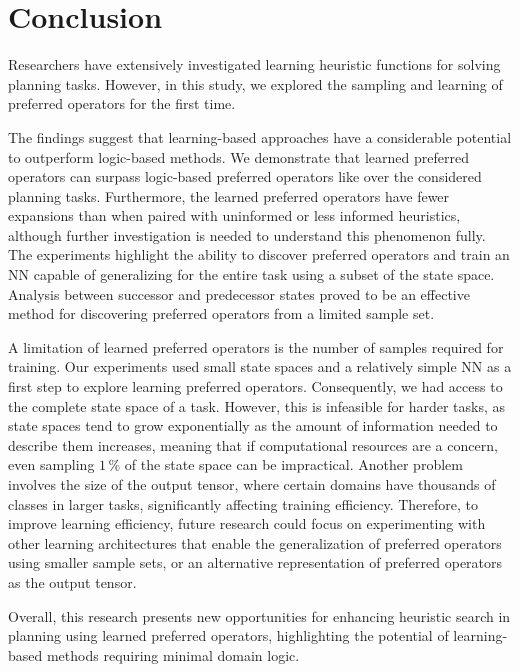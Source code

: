 \documentclass[ppgc,diss,english]{iiufrgs}
\begin{document}
\chapter{Conclusion}
\label{cha:conclusion}
Researchers have extensively investigated learning heuristic functions for solving planning tasks.
However, in this study, we explored the sampling and learning of preferred operators for the first time.

The findings suggest that learning-based approaches have a considerable potential to outperform logic-based methods. We demonstrate that learned preferred operators can surpass logic-based preferred operators like \poff over the considered planning tasks. Furthermore, the learned preferred operators have fewer expansions than \poff when paired with uninformed or less informed heuristics, although further investigation is needed to understand this phenomenon fully.
The experiments highlight the ability to discover preferred operators and train an NN capable of generalizing for the entire task using a subset of the state space. Analysis between successor and predecessor states proved to be an effective method for discovering preferred operators from a limited sample set.

A limitation of learned preferred operators is the number of samples required for training. Our experiments used small state spaces and a relatively simple NN as a first step to explore learning preferred operators. Consequently, we had access to the complete state space of a task. However, this is infeasible for harder tasks, as state spaces tend to grow exponentially as the amount of information needed to describe them increases, meaning that if computational resources are a concern, even sampling $1\,\%$ of the state space can be impractical.
Another problem involves the size of the output tensor, where certain domains have thousands of classes in larger tasks, significantly affecting training efficiency.
Therefore, to improve learning efficiency, future research could focus on experimenting with other learning architectures that enable the generalization of preferred operators using smaller sample sets, or an alternative representation of preferred operators as the output tensor.

Overall, this research presents new opportunities for enhancing heuristic search in planning using learned preferred operators, highlighting the potential of learning-based methods requiring minimal domain logic.



\end{document}
